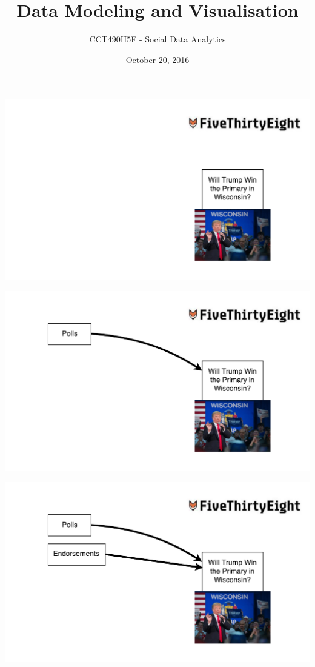 \documentclass{beamer}
\title[Data Modeling and Visualisation]
{Data Modeling and Visualisation}
\author{CCT490H5F - Social Data Analytics}
\institute[] {
    Professor Alex Hanna
}
\date[] {
October 20, 2016
}
\begin{document}
\begin{frame}
  \titlepage
\end{frame}

\begin{frame}[plain]
    \includegraphics[width=\textwidth]{img/538-primary-1.pdf}
\end{frame}

\begin{frame}[plain]
    \includegraphics[width=\textwidth]{img/538-primary-2.pdf}
\end{frame}

\begin{frame}[plain]
    \includegraphics[width=\textwidth]{img/538-primary-3.pdf}
\end{frame}
\end{document}
